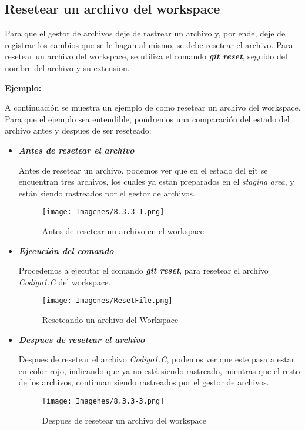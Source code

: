 \subsection{Resetear un archivo del workspace}

Para que el gestor de archivos deje de rastrear un archivo y, por ende, deje de registrar los cambios que se le hagan al mismo, se debe resetear el archivo. Para resetear un archivo del workspace, se utiliza el comando \textit{\textbf{git reset}}, seguido del nombre del archivo y su extension.

\textbf{\underline{Ejemplo:}}

A continuación se muestra un ejemplo de como resetear un archivo del workspace. Para que el ejemplo sea entendible, pondremos una comparación del estado del archivo antes y despues de ser reseteado:

\begin{itemize}
    \item \textbf{\textit{Antes de resetear el archivo}}

    Antes de resetear un archivo, podemos ver que en el estado del git se encuentran tres archivos, los cuales ya estan preparados en el \emph{staging area}, y están siendo rastreados por el gestor de archivos.
    
        \begin{figure}[H]
            \centering
            \texttt{[image: Imagenes/8.3.3-1.png]}
            \caption{Antes de resetear un archivo en el workspace}
            \label{}
        \end{figure}
    
    \item \textbf{\textit{Ejecución del comando}}

    Procedemos a ejecutar el comando \textbf{\textit{git reset}}, para resetear el archivo \textit{Codigo1.C} del workspace.
    
        \begin{figure}[H]
            \centering
            \texttt{[image: Imagenes/ResetFile.png]}
            \caption{Reseteando un archivo del Workspace}
            \label{}
        \end{figure}
    
    \item \textbf{\textit{Despues de resetear el archivo}}

    Despues de resetear el archivo \textit{Codigo1.C}, podemos ver que este pasa a estar en color rojo, indicando que ya no está siendo rastreado, mientras que el resto de los archivos, continuan siendo rastreados por el gestor de archivos.
    
        \begin{figure}[H]
            \centering
            \texttt{[image: Imagenes/8.3.3-3.png]}
            \caption{Despues de resetear un archivo del workspace}
            \label{}
        \end{figure}
    
\end{itemize}

